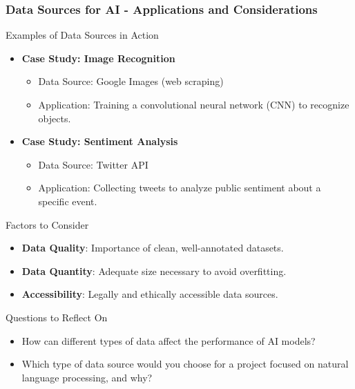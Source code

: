 \documentclass[aspectratio=169]{beamer}
\begin{document}
\begin{frame}[fragile]
    \frametitle{Data Sources for AI - Applications and Considerations}
    \begin{block}{Examples of Data Sources in Action}
        \begin{itemize}
            \item \textbf{Case Study: Image Recognition}
            \begin{itemize}
                \item Data Source: Google Images (web scraping)
                \item Application: Training a convolutional neural network (CNN) to recognize objects.
            \end{itemize}
            \item \textbf{Case Study: Sentiment Analysis}
            \begin{itemize}
                \item Data Source: Twitter API
                \item Application: Collecting tweets to analyze public sentiment about a specific event.
            \end{itemize}
        \end{itemize}
    \end{block}

    \begin{block}{Factors to Consider}
        \begin{itemize}
            \item \textbf{Data Quality}: Importance of clean, well-annotated datasets.
            \item \textbf{Data Quantity}: Adequate size necessary to avoid overfitting.
            \item \textbf{Accessibility}: Legally and ethically accessible data sources.
        \end{itemize}
    \end{block}
    
    \begin{block}{Questions to Reflect On}
        \begin{itemize}
            \item How can different types of data affect the performance of AI models?
            \item Which type of data source would you choose for a project focused on natural language processing, and why?
        \end{itemize}
    \end{block}
\end{frame}
\end{document}
